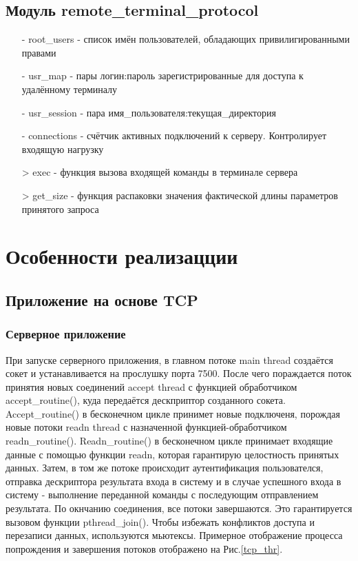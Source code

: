 \subsection{Модуль remote_terminal_protocol}
\begin{itemize}
\item[-] root_users - список имён пользователей, обладающих привилигированными правами
\item[-] usr_map - пары логин:пароль зарегистрированные для доступа к удалённому терминалу
\item[-] usr_session - пара имя_пользователя:текущая_директория
\item[-] connections - счётчик активных подключений к серверу. Контролирует входящую нагрузку 
\item[>] exec - функция вызова входящей команды в терминале сервера
\item[>] get_size - функция распаковки значения фактической длины параметров принятого запроса
\end{itemize}

\section{Особенности реализацции}

\subsection{Приложение на основе TCP}

\subsubsection{Серверное приложение}

При запуске серверного приложения, в главном потоке main thread создаётся сокет и устанавливается на прослушку порта 7500. После чего пораждается поток принятия новых соединений accept thread с функцией обработчиком accept_routine(), куда передаётся дескприптор созданного сокета. Accept_routine() в бесконечном цикле принимет новые подключеня, порождая новые потоки readn thread  с назначенной функцией-обработчиком readn_routine(). Readn_routine() в бесконечном цикле принимает входящие данные с помощью функции readn, которая гарантирую целостность принятых данных. Затем, в том же потоке  происходит аутентификация пользователся, отправка дескриптора результата входа в систему и в случае успешного входа в систему - выполнение переданной команды с последующим отправлением результата. По окнчанию соединения, все потоки завершаются. Это гарантируется вызовом функции pthread_join(). Чтобы избежать конфликтов доступа и перезаписи данных, используются мьютексы. Примерное отображение процесса попрождения и завершения потоков отображено на Рис.\ref{tcp_thr}.

